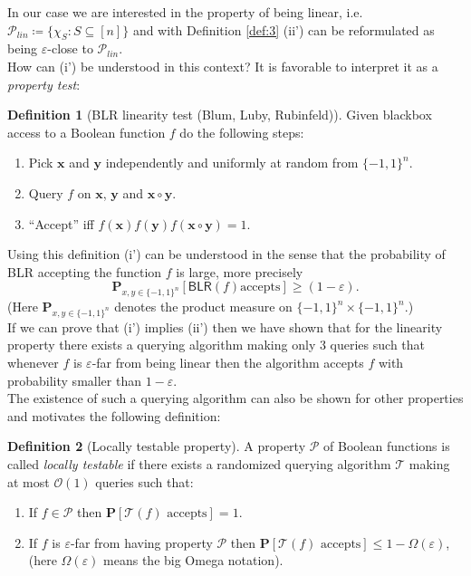 \documentclass[a4paper]{article}
\newcommand{\prob}{\mathbf{P}}
\newcommand{\prty}{\mathcal{P}}
\newcommand{\nset}{[n]}
\newcommand{\eps}{\varepsilon}
\newcommand{\boldx}{\boldsymbol{x}}
\newcommand{\boldy}{\boldsymbol{y}}
\theoremstyle{plain}
\theoremstyle{definition}
\newtheorem{definition}{Definition}
\theoremstyle{remark}
\begin{document}
\noindent In our case we are interested in the property of being
linear, i.e. \(\prty_{lin} \coloneqq \{\chi_S: S \subseteq
\nset\}\) and with Definition \ref{def:3} (ii') can be reformulated as
being \(\eps\)-close to \(\prty_{lin}\). \\

\noindent How can (i') be understood in this context? It is favorable to
interpret it as a \emph{property test}: 

\begin{definition}[\textsf{BLR} linearity test (Blum, Luby,
  Rubinfeld)] \label{def:4}
  Given blackbox access to a Boolean function \(f\) do the following
  steps: 
  \begin{enumerate}
  \item Pick \(\boldx\) and \(\boldy\) independently and uniformly at random
    from \(\{-1,1\}^n\).
  \item Query \(f\) on \(\boldx\), \(\boldy\) and \(\boldx \circ \boldy\).
  \item ``Accept'' iff \(f(\boldx)f(\boldy)f(\boldx \circ \boldy) = 1\). 
  \end{enumerate}
\end{definition}

\noindent Using this definition (i') can be understood in the sense
that the probability of \textsf{BLR} accepting the function \(f\) is
large, more precisely \[\prob_{x,y \in \{-1,1\}^n}\left[\textsf{BLR}(f) \text{
    accepts}\right] \geq (1-\eps).\]
(Here \(\prob_{x,y \in \{-1,1\}^n}\) denotes the product measure on
\(\{-1,1\}^n \times \{-1,1\}^n\).)\\

\noindent If we can prove that (i') implies (ii') then we have
shown that for the linearity property there exists a querying
algorithm making only \(3\) queries such that whenever \(f\) is
\(\eps\)-far from being linear then the algorithm accepts \(f\) with
probability smaller than \(1-\eps\). \\
The existence of such a querying algorithm can also be shown for other
properties and motivates the following definition: 

\begin{definition}[Locally testable property] \label{def:5}
  A property \(\prty\) of Boolean functions is called \emph{locally
    testable} if there exists a randomized querying algorithm
  \(\mathcal{T}\) making at most \(\mathcal{O}(1)\) queries such that: 
  \begin{enumerate}[label=(\roman*)]
  \item If \(f \in \prty\) then \(\prob[\mathcal{T}(f) \text{ accepts}] = 1\).
  \item If \(f\) is \(\eps\)-far from having property \(\prty\) then
    \(\prob[\mathcal{T}(f) \text{ accepts}] \leq 1 - \Omega(\eps)\),
    (here \(\Omega(\eps)\) means the big Omega notation).
  \end{enumerate}
\end{definition}
\end{document}
